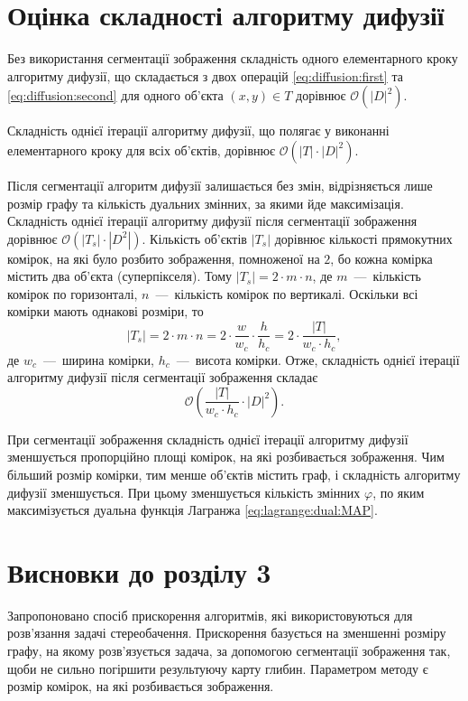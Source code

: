 \section{Оцінка складності алгоритму дифузії}

Без використання сегментації зображення складність
одного елементарного кроку алгоритму дифузії,
що складається з двох операцій \eqref{eq:diffusion:first} та
\eqref{eq:diffusion:second} для одного об'єкта $\left(x, y \right) \in T$
дорівнює $\mathcal{O} \left( \left| D \right|^2 \right)$.

Складність однієї ітерації алгоритму дифузії,
що полягає у виконанні елементарного кроку для всіх об'єктів,
дорівнює $\mathcal{O} \left(\left|T \right| \cdot \left|D\right|^2 \right)$.

Після сегментації алгоритм дифузії залишається без змін,
відрізняється лише розмір графу та кількість дуальних змінних,
за якими йде максимізація.
Складність однієї ітерації алгоритму дифузії
після сегментації зображення дорівнює
$\mathcal{O} \left( \left| T_s \right| \cdot \left| D^2 \right| \right)$.
Кількість об'єктів $\left| T_s \right|$ дорівнює кількості прямокутних комірок,
на які було розбито зображення, помноженої на $2$,
бо кожна комірка містить два об'єкта (суперпікселя).
Тому $\left| T_s \right| = 2 \cdot m \cdot n$,
де $m$~---~кількість комірок по горизонталі,
$n$~---~кількість комірок по вертикалі.
Оскільки всі комірки мають однакові розміри, то
\begin{equation*}
    \left| T_s \right| =
    2 \cdot m \cdot n =
    2 \cdot \frac{w}{w_c} \cdot \frac{h}{h_c} =
    2 \cdot \frac{\left| T \right|}{w_c \cdot h_c},
\end{equation*}
де $w_c$~---~ширина комірки, $h_c$~---~висота комірки.
Отже, складність однієї ітерації алгоритму дифузії після
сегментації зображення складає
\begin{equation} \label{eq:diffusion:superpixel:complexity}
    \mathcal{O} \left(
        \frac{\left| T \right|}{w_c \cdot h_c} \cdot \left| D \right|^2
    \right).
\end{equation}

При сегментації зображення складність однієї ітерації алгоритму дифузії
зменшується пропорційно площі комірок, на які розбивається зображення.
Чим більший розмір комірки, тим менше об'єктів містить граф,
і складність алгоритму дифузії зменшується.
При цьому зменшується кількість змінних $\varphi$,
по яким максимізується дуальна функція Лагранжа \eqref{eq:lagrange:dual:MAP}.

\section*{Висновки до розділу 3}

Запропоновано спосіб прискорення алгоритмів,
які використовуються для розв'язання задачі стереобачення.
Прискорення базується на зменшенні розміру графу,
на якому розв'язується задача, за допомогою сегментації зображення так,
щоби не сильно погіршити результуючу карту глибин.
Параметром методу є розмір комірок, на які розбивається зображення.
